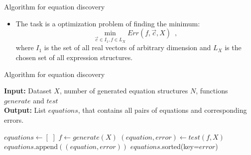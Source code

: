 \documentclass[t,usenames,dvipsnames]{beamer} %
\newcommand{\R}{\mathbb R}
\newcommand{\1}{\boldsymbol{1}}
\newcommand{\0}{\boldsymbol{0}}
\begin{document}
\begin{frame}{Algorithm for equation discovery}
\begin{itemize}[<+->]
\item The task is a optimization problem of finding the minimum:
    \[ \min_{\vec{c}\in I_1, f \in L_X}  Err(f, \vec{c}, X)\enspace, \]
    where \(I_1\) is the set of all real vectors of arbitrary dimension
    and $L_X$ is the chosen set of all expression structures.
       

       \end{itemize}


       
\end{frame}


\begin{frame}{Algorithm for equation discovery}
\begin{algorithm}[H]  %
\caption{Equation discovery with approach \textbf{generate and test}}
\raggedright
\textbf{Input:} Dataset $X$, number of generated equation structures $N$, functions $generate$ and $test$ \\
\textbf{Output:} List $equations$, that contains all pairs of equations and corresponding errors.
\begin{algorithmic}[1]
\State $equations \gets [\,\,]$
\State $f \gets generate(X)$
\State $(equation, error) \gets test(f, X)$
\State $equations.\textrm{append}((equation, error))$
\EndFor
\State \Return $equations$.sorted(key=$error$) 
\EndFunction
\end{algorithmic}
\end{algorithm}
\end{frame}
\end{document}
